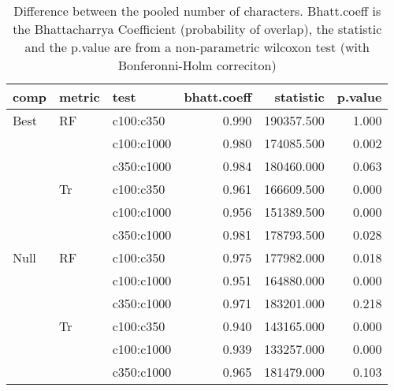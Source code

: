 \begin{table}[ht]
\centering
\begin{tabular}{lllrrr}
  \hline
comp & metric & test & bhatt.coeff & statistic & p.value \\ 
  \hline
Best & RF & c100:c350 & 0.990 & 190357.500 & 1.000 \\ 
   &  & c100:c1000 & 0.980 & 174085.500 & 0.002 \\ 
   &  & c350:c1000 & 0.984 & 180460.000 & 0.063 \\ 
   & Tr & c100:c350 & 0.961 & 166609.500 & 0.000 \\ 
   &  & c100:c1000 & 0.956 & 151389.500 & 0.000 \\ 
   &  & c350:c1000 & 0.981 & 178793.500 & 0.028 \\ 
  Null & RF & c100:c350 & 0.975 & 177982.000 & 0.018 \\ 
   &  & c100:c1000 & 0.951 & 164880.000 & 0.000 \\ 
   &  & c350:c1000 & 0.971 & 183201.000 & 0.218 \\ 
   & Tr & c100:c350 & 0.940 & 143165.000 & 0.000 \\ 
   &  & c100:c1000 & 0.939 & 133257.000 & 0.000 \\ 
   &  & c350:c1000 & 0.965 & 181479.000 & 0.103 \\ 
   \hline
\end{tabular}
\caption{Difference between the pooled number of characters. Bhatt.coeff is the Bhattacharrya Coefficient (probability of overlap), the statistic and the p.value are from a non-parametric wilcoxon test (with Bonferonni-Holm correciton)} 
\label{Full_Tab_pooledscharacters_test}
\end{table}
